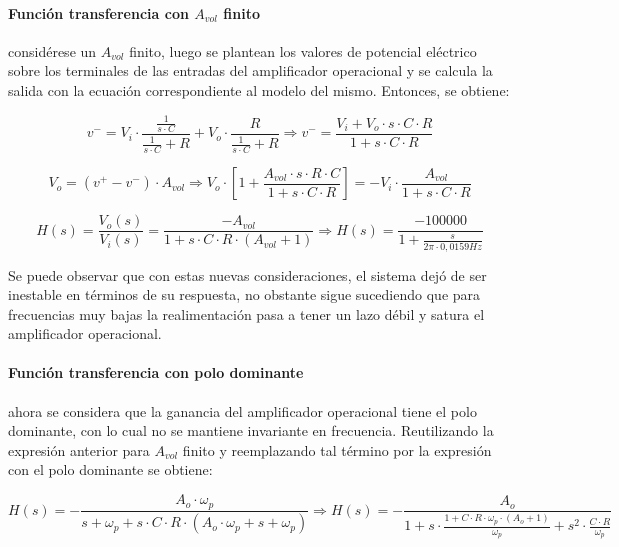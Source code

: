 \paragraph*{Funci\'on transferencia con $A_{vol}$ finito} consid\'erese un $A_{vol}$ finito, luego se plantean los valores de potencial el\'ectrico sobre los terminales de las entradas del amplificador operacional y se calcula la salida con la ecuaci\'on correspondiente al modelo del mismo. Entonces, se obtiene:

\begin{equation*}
	v^{-} = V_i \cdot \frac{\frac{1}{s \cdot C}}{\frac{1}{s \cdot C} + R} + V_o \cdot \frac{R}{\frac{1}{s \cdot C} + R}
	\Rightarrow
	v^{-} = \frac{V_i + V_o \cdot s \cdot C \cdot R}{1 + s \cdot C \cdot R}
\end{equation*}

\begin{equation*}
	V_o = (v^{+} - v^{-}) \cdot A_{vol} \Rightarrow
	V_o \cdot \left[ 1 + \frac{A_{vol} \cdot s \cdot R \cdot C}{1 + s \cdot C \cdot R} \right] =
	- V_i \cdot \frac{A_{vol}}{1 + s \cdot C \cdot R}
\end{equation*}

\begin{equation}
	H(s) = \frac{V_o(s)}{V_i(s)} = \frac{-A_{vol}}{1 + s \cdot C \cdot R \cdot (A_{vol} + 1)}
	\Rightarrow
	H(s) = \frac{-100000}{1 + \frac{s}{2 \pi \cdot 0,0159Hz}}
	\label{eq:integrador_transfer_avol_finito}
\end{equation}

Se puede observar que con estas nuevas consideraciones, el sistema dej\'o de ser inestable en t\'erminos de su respuesta, no obstante sigue sucediendo que para frecuencias muy bajas la realimentaci\'on pasa a tener un lazo d\'ebil y satura el amplificador operacional.

\paragraph*{Funci\'on transferencia con polo dominante} ahora se considera que la ganancia del amplificador operacional tiene el polo dominante, con lo cual no se mantiene invariante en frecuencia. Reutilizando la expresi\'on anterior para $A_{vol}$ finito y reemplazando tal t\'ermino por la expresi\'on con el polo dominante se obtiene:

\begin{equation*}
	H(s) = - \frac{A_o \cdot \omega_p}{s + \omega_p + s \cdot C \cdot R \cdot (A_o \cdot \omega_p + s + \omega_p)}
	\Rightarrow
	H(s) = - \frac{A_o}{1 + s \cdot \frac{1 + C \cdot R \cdot \omega_p \cdot ( A_o + 1 )}{\omega_p} + s^{2} \cdot \frac{C \cdot R}{\omega_p}}
\end{equation*}

